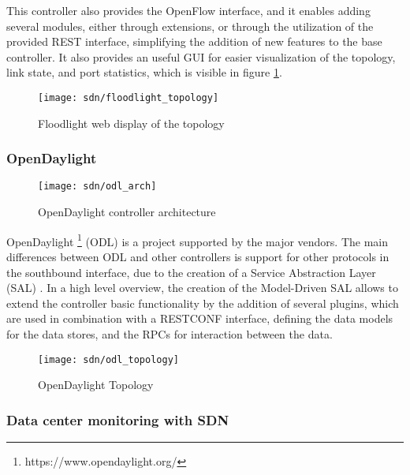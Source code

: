 \begin {enumerate}
\begin{enumerate}
\par This controller also provides the OpenFlow interface, and it enables adding several modules, either through extensions, or through the utilization of the
provided REST interface, simplifying the addition of new features to the base controller. It also provides an useful GUI for easier visualization of the topology,
link state, and port statistics, which is visible in figure \ref{fig:flood_gui}.
 
\begin{figure}[H]
  \centering
  \texttt{[image: sdn/floodlight\_topology]}
  \label{fig:flood_gui}
  \caption{Floodlight web display of the topology}
\end{figure}

\subsubsection {OpenDaylight} \label{chap:odl}

\begin{figure}[H]
  \centering
  \texttt{[image: sdn/odl\_arch]}
  \label{fig:odl_arch}
  \caption {OpenDaylight controller architecture \cite{medved_opendaylight:_2014}}
\end{figure}

OpenDaylight \footnote{https://www.opendaylight.org/} (ODL) is a project supported by the major vendors. The main differences between ODL and other controllers
is support for other protocols in the southbound interface, due to the creation of a Service Abstraction Layer (SAL) \cite{medved_opendaylight:_2014}. In a high 
level overview, the creation of the Model-Driven SAL allows to extend the controller basic functionality by the addition of several plugins, which are used in
combination with a RESTCONF \cite{bierman_restconf_2017} interface, defining the data models for the data stores, and the RPCs for interaction between the data.

\begin{figure}[H]
  \centering
  \texttt{[image: sdn/odl\_topology]}
  \label{fig:odl_topo}
  \caption {OpenDaylight Topology}
\end{figure}

\subsubsection {Data center monitoring with SDN}


\end{enumerate}
\end{enumerate}
